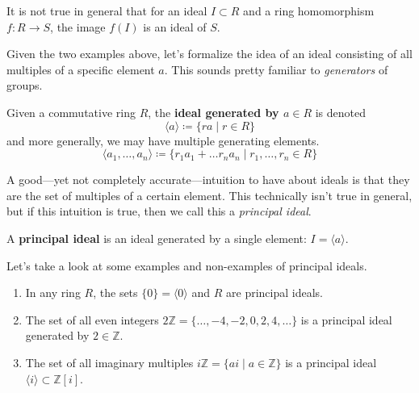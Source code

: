   \begin{example}
    It is not true in general that for an ideal $I \subset R$ and a ring homomorphism $f: R \to S$, the image $f(I)$ is an ideal of $S$. 
  \end{example}

  Given the two examples above, let's formalize the idea of an ideal consisting of all multiples of a specific element $a$. This sounds pretty familiar to \textit{generators} of groups. 

  \begin{definition}
    Given a commutative ring $R$, the \textbf{ideal generated by $a \in R$} is denoted 
    \begin{equation}
      \langle a \rangle \coloneqq \{r a \mid r \in R\}
    \end{equation}
    and more generally, we may have multiple generating elements. 
    \begin{equation}
      \langle a_1, \ldots, a_n \rangle \coloneqq \{ r_1 a_1 + \ldots r_n a_n \mid r_1, \ldots, r_n \in R \}
    \end{equation}
  \end{definition}

  A good---yet not completely accurate---intuition to have about ideals is that they are the set of multiples of a certain element. This technically isn't true in general, but if this intuition is true, then we call this a \textit{principal ideal}. 

  \begin{definition}
    A \textbf{principal ideal} is an ideal generated by a single element: $I = \langle a \rangle$. 
  \end{definition}

  \begin{example}
    Let's take a look at some examples and non-examples of principal ideals. 
    \begin{enumerate}
      \item In any ring $R$, the sets $\{0\} = \langle 0 \rangle$ and $R$ are principal ideals. 
      \item The set of all even integers $2\mathbb{Z} = \{\ldots, -4, -2, 0, 2, 4, \ldots\}$ is a principal ideal generated by $2 \in \mathbb{Z}$. 
      \item The set of all imaginary multiples $i\mathbb{Z} = \{ai \mid a \in \mathbb{Z} \}$ is a principal ideal $\langle i \rangle \subset \mathbb{Z}[i]$. 
    \end{enumerate}
  \end{example}

